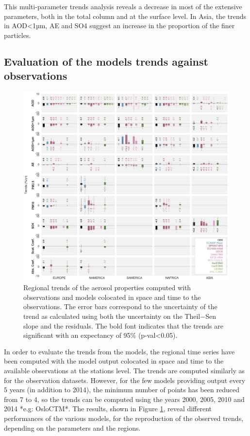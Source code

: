 \documentclass[journal abbreviation, manuscript]{copernicus}
\begin{document}
This multi-parameter trends analysis reveals a decrease in most of the extensive parameters, both in the total column and at the surface level. In Asia, the trends in AOD<1µm, AE and SO4 suggest an increase in the proportion of the finer particles. 

\subsection{Evaluation of the models trends against observations}

\begin{figure}[t]
 \includegraphics[width=16cm]{../scripts/figs/heatmaps/BARS.png}
 \caption{Regional trends of the aerosol properties computed with observations and models colocated in space and time to the observations. The error bars correspond to the uncertainty of the trend as calculated using both the uncertainty on the Theil−Sen slope and the residuals. The bold font indicates that the trends are significant with an expectancy of 95\% (p-val<0.05).}
 \label{fig:bars}
\end{figure}

In order to evaluate the trends from the models, the regional time series have been computed with the model output colocated in space and time to the available observations at the stations level. The trends are computed similarly as for the observation datasets. However, for the few models providing output every 5 years (in addition to 2014), the minimum number of points has been reduced from 7 to 4, so the trends can be computed using the years 2000, 2005, 2010 and 2014 *e.g: OsloCTM*. The results, shown in Figure \ref{fig:bars}, reveal different performances of the various models, for the reproduction of the observed trends, depending on the parameters and the regions.
\end{document}
